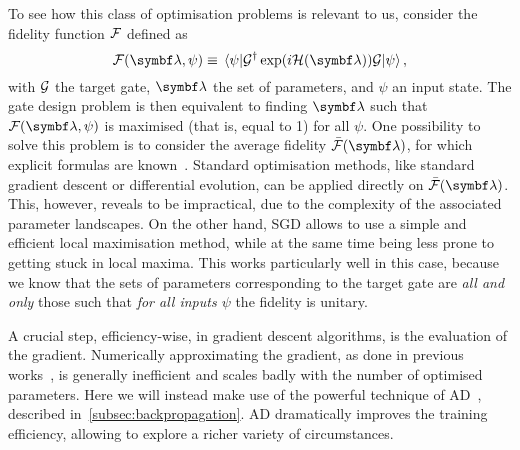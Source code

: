 To see how this class of optimisation problems is relevant to us, consider the fidelity function ${\mathcal{F}}$ defined as
\begin{equation}
	\calF(\bs\lambda, \psi) \equiv \mel{\psi}{\calG^\dagger \exp(i \calH(\bs\lambda)) \calG}{\psi},
	\label{eq:def_fidelity}
\end{equation}
with ${\mathcal{G}}$ the target gate, $\bs\lambda$ the set of parameters, and $\psi$ an input state.
The gate design problem is then equivalent to finding $\bs\lambda$ such that $\calF(\bs\lambda, \psi)$ is maximised (that is, equal to 1) for all $\psi$.
One possibility to solve this problem is to consider the average fidelity $\bar{\calF}(\bs\lambda)$, for which explicit formulas are known~\cite{banchi2011nonperturbative,pedersen2007fidelity,magesan2011gate}.
Standard optimisation methods, like standard gradient descent or differential evolution, can be applied directly on $\bar{\calF}(\bs\lambda)$.
This, however, reveals to be impractical, due to the complexity of the associated parameter landscapes.
On the other hand, \ac{SGD} allows to use a simple and efficient local maximisation method, while at the same time being less prone to getting stuck in local maxima.
This works particularly well in this case, because we know that the sets of parameters corresponding to the target gate are \emph{all and only} those such that \emph{for all inputs $\psi$} the fidelity is unitary.

A crucial step, efficiency-wise, in gradient descent algorithms, is the evaluation of the gradient.
Numerically approximating the gradient, as done in previous works~\cite{banchi2016quantum}, is generally inefficient and scales badly with the number of optimised parameters.
Here we will instead make use of the powerful technique of \acf{AD}~\cite{bartholomewbiggs2000automatic,bischof2008advances}, described in~\cref{subsec:backpropagation}.
\ac{AD} dramatically improves the training efficiency, allowing to explore a richer variety of circumstances.



